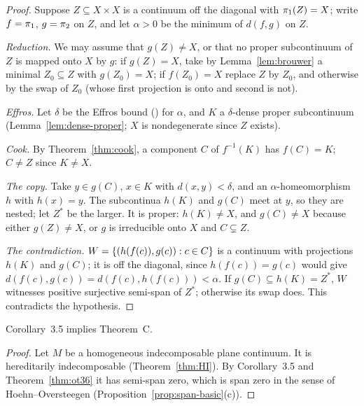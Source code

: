 \begin{proof}
Suppose $Z\subseteq X\times X$ is a continuum off the diagonal with $\pi_{1}(Z)=X$; write $f=\pi_{1}$, $g=\pi_{2}$ on $Z$, and let $\alpha>0$ be the minimum of $d(f,g)$ on $Z$.

\emph{Reduction.} We may assume that $g(Z)\ne X$, or that no proper subcontinuum of $Z$ is mapped onto $X$ by $g$: if $g(Z)=X$, take by
Lemma~\ref{lem:brouwer} a minimal $Z_0\subseteq Z$ with $g(Z_0)=X$; if $f(Z_0)=X$ replace $Z$ by $Z_0$, and otherwise by the swap of $Z_0$ (whose
first projection is onto and second is not).

\emph{Effros.} Let $\delta$ be the Effros bound () for $\alpha$, and $K$ a $\delta$-dense proper subcontinuum (Lemma~\ref{lem:dense-proper};
$X$ is nondegenerate since $Z$ exists).

\emph{Cook.} By Theorem~\ref{thm:cook}, a component $C$ of $f^{-1}(K)$ has $f(C)=K$; $C\ne Z$ since $K\ne X$.

\emph{The copy.} Take $y\in g(C)$, $x\in K$ with $d(x,y)<\delta$, and an $\alpha$-homeomorphism $h$ with $h(x)=y$. The subcontinua $h(K)$ and $g(C)$ meet at
$y$, so they are nested; let $Z^*$ be the larger. It is proper: $h(K)\ne X$, and $g(C)\ne X$ because either $g(Z)\ne X$, or $g$ is irreducible onto $X$
and $C\subsetneq Z$.

\emph{The contradiction.} $W=\left\{ (h(f(c)),g(c)):c\in C \right\}$ is a continuum with projections $h(K)$ and $g(C)$; it is off the diagonal, since
$h(f(c))=g(c)$ would give $d(f(c),g(c))=d(f(c),h(f(c)))<\alpha$. If $g(C)\subseteq h(K)=Z^*$, $W$ witnesses positive surjective semi-span of $Z^*$; otherwise its
swap does. This contradicts the hypothesis.
\end{proof}


\begin{corollary}\label{cor:C-from-35}
Corollary~3.5 implies Theorem~C.
\end{corollary}

\begin{proof}
Let $M$ be a homogeneous indecomposable plane continuum. It is hereditarily indecomposable (Theorem~\ref{thm:HI}). By Corollary~3.5 and
Theorem~\ref{thm:ot36} it has semi-span zero, which is span zero in the sense of Hoehn--Oversteegen
(Proposition~\ref{prop:span-basic}(c)).
\end{proof}


